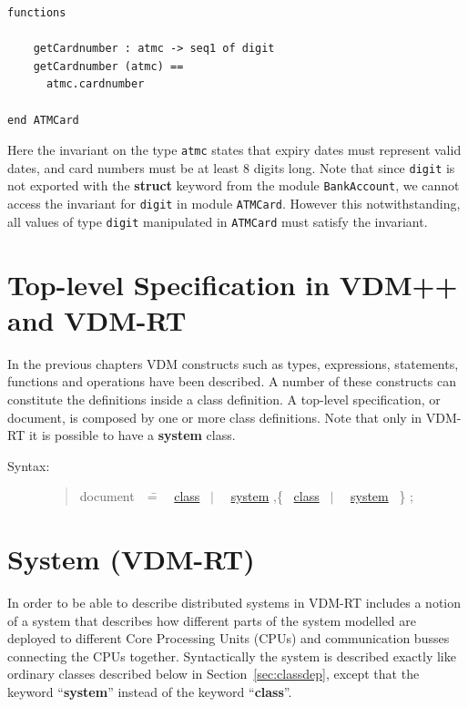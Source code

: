 \documentclass{overturerepchap}
\newcommand{\Rule}[2]{
  \begin{quote}\begin{tabbing}
    #1\index{#1}\ \ \= = \ \ \= #2  ; %
    
  \end{tabbing}\end{quote}
  }
\newcommand{\Ruleref}[1]{
  \hyperlink{rule:#1}{#1}}
\newcommand{\SeqPt}[1]{\{\ #1\ \}}
\newcommand{\dsepl}{\ $|$\ }
\newcommand{\keyw}[1]{{\bf\ttfamily #1}}
\begin{document}
\begin{description}
\begin{lstlisting}
functions

    getCardnumber : atmc -> seq1 of digit
    getCardnumber (atmc) ==
      atmc.cardnumber

end ATMCard
\end{lstlisting}
Here the invariant on the type \texttt{atmc} states that expiry dates
must represent valid dates, and card numbers must be at least 8 digits
long. Note that since \texttt{digit} is not exported with the
\keyw{struct} keyword from the module \texttt{BankAccount}, we cannot
access the invariant for \texttt{digit} in module
\texttt{ATMCard}. However this notwithstanding, all values of type
\texttt{digit} manipulated in \texttt{ATMCard} must satisfy the
invariant. 

\end{description}

\section{Top-level Specification in VDM++ and VDM-RT}

In the previous chapters VDM constructs such as types,
expressions, statements, functions and operations have been
described. A number of these constructs can constitute the definitions
inside a class definition. A top-level specification, or document, is
composed by one or more class definitions. Note that only in VDM-RT it
is possible to have a \keyw{system} class.

\begin{description}
\item[Syntax:]
\Rule{document}{
   \Ruleref{class} 
   \dsepl\ \Ruleref{system}
   ,\SeqPt{\Ruleref{class}
   \dsepl\ \Ruleref{system}
         }
  }
\end{description}

\section{System (VDM-RT) }\label{sec:system}

In order to be able to describe distributed systems in VDM-RT includes
a notion of a system that describes how different parts of the system 
modelled are deployed to different Core Processing Units (CPUs) and 
communication busses connecting the CPUs together. Syntactically the 
system is described exactly like ordinary classes described below in 
Section~\ref{sec:classdep}, except that the keyword ``\keyw{system}'' 
instead of the keyword ``\keyw{class}''. 
\end{document}
